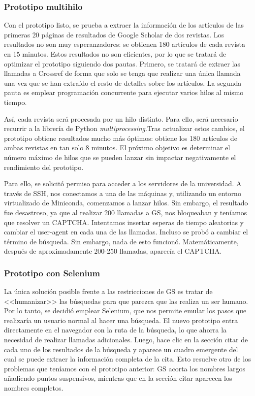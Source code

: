 \subsubsection{Prototipo multihilo}

Con el prototipo listo, se prueba a extraer la información de los artículos de las primeras 20 páginas de resultados de Google Scholar de dos revistas. Los resultados no son muy esperanzadores: se obtienen 180 artículos de cada revista en 15 minutos. Estos resultados no son eficientes, por lo que se tratará de optimizar el prototipo siguiendo dos pautas. Primero, se tratará de extraer las llamadas a Crossref de forma que solo se tenga que realizar una única llamada una vez que se han extraído el resto de detalles sobre los artículos. La segunda pauta es emplear programación concurrente para ejecutar varios hilos al mismo tiempo. 

Así, cada revista será procesada por un hilo distinto. Para ello, será necesario recurrir a la librería de Python \textit{multiprocessing}.Tras actualizar estos cambios, el prototipo obtiene resultados mucho más óptimos: obtiene los 180 artículos de ambas revistas en tan solo 8 minutos. El próximo objetivo es determinar el número máximo de hilos que se pueden lanzar sin impactar negativamente el rendimiento del prototipo.

Para ello, se solicitó permiso para acceder a los servidores de la universidad. A través de SSH, nos conectamos a una de las máquinas y, utilizando un entorno virtualizado de Miniconda, comenzamos a lanzar hilos. Sin embargo, el resultado fue desastroso, ya que al realizar 200 llamadas a GS, nos bloqueaban y teníamos que resolver un CAPTCHA. Intentamos insertar esperas de tiempo aleatorias y cambiar el user-agent en cada una de las llamadas. Incluso se probó a cambiar el término de búsqueda. Sin embargo, nada de esto funcionó. Matemáticamente, después de aproximadamente 200-250 llamadas, aparecía el CAPTCHA.


\subsubsection{Prototipo con Selenium}
La única solución posible frente a las restricciones de GS es tratar de <<humanizar>> las búsquedas para que parezca que las realiza un ser humano. Por lo tanto, se decidió emplear Selenium, que nos permite emular los pasos que realizaría un usuario normal al hacer una búsqueda. El nuevo prototipo entra directamente en el navegador con la ruta de la búsqueda, lo que ahorra la necesidad de realizar llamadas adicionales. Luego, hace clic en la sección citar de cada uno de los resultados de la búsqueda y aparece un cuadro emergente del cual se puede extraer la información completa de la cita. Esto resuelve otro de los problemas que teníamos con el prototipo anterior: GS acorta los nombres largos añadiendo puntos suspensivos, mientras que en la sección citar aparecen los nombres completos. 

